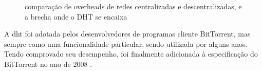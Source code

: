 \begin{figure}[H]
    \centering
    \caption{comparação de overheads de redes centralizadas e descentralizadas, e a
    brecha onde o DHT se encaixa}
\end{figure}

A \gls*{dht} foi adotada pelos desenvolvedores de programas cliente BitTorrent, mas
sempre como uma funcionalidade particular, sendo utilizada por alguns anos. Tendo
comprovado seu desempenho, foi finalmente adicionada à especificação do BitTorrent no
ano de 2008 \cite{site:bittorrent-dht}.


